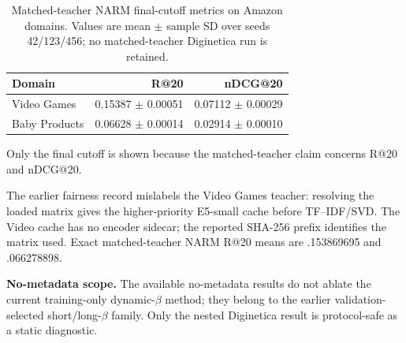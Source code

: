 \begin{table}[h]
\caption{Matched-teacher NARM final-cutoff metrics on Amazon domains. Values are mean $\pm$ sample SD over seeds 42/123/456; no matched-teacher Diginetica run is retained.}
\centering\small
\begin{tabular}{lrr}
\toprule
Domain & R@20 & nDCG@20\\
\midrule
Video Games & 0.15387 $\pm$ 0.00051 & 0.07112 $\pm$ 0.00029\\
Baby Products & 0.06628 $\pm$ 0.00014 & 0.02914 $\pm$ 0.00010\\
\bottomrule
\end{tabular}
\par\smallskip\scriptsize Only the final cutoff is shown because the matched-teacher claim concerns R@20 and nDCG@20.
\par\smallskip\scriptsize The earlier fairness record mislabels the Video Games teacher: resolving the loaded matrix gives the higher-priority E5-small cache before TF--IDF/SVD. The Video cache has no encoder sidecar; the reported SHA-256 prefix identifies the matrix used. Exact matched-teacher NARM R@20 means are .153869695 and .066278898.
\end{table}

\noindent\textbf{No-metadata scope.} The available no-metadata results do not ablate the current training-only dynamic-$\beta$ method; they belong to the earlier validation-selected short/long-$\beta$ family. Only the nested Diginetica result is protocol-safe as a static diagnostic.

